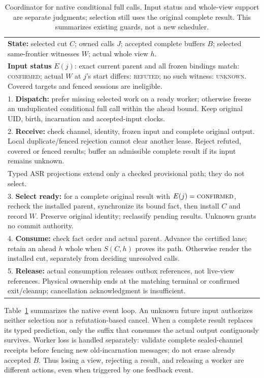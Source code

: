 \begin{table}[t]
\centering
\caption{Coordinator for native conditional full calls. Input status and
whole-view support are separate judgments; selection still uses the
original complete result. This summarizes existing guards, not a new
scheduler.}
\label{tab:coordinator}
\begingroup\small
\begin{tabular}{@{}p{}@{}}
\toprule
\textbf{State:} selected cut $C$; owned calls $J$; accepted complete
buffers $B$; selected same-frontier witnesses $W$; actual whole view $h$.\\
\textbf{Input status} $E(j)$: exact current parent and all frozen bindings
match: \textsc{confirmed}; actual $W$ at $j$'s start differs:
\textsc{refuted}; no such witness: \textsc{unknown}.
Covered targets and fenced sessions are ineligible.\\
\midrule
1. \textbf{Dispatch:} prefer missing selected work on a ready worker;
otherwise freeze an unduplicated conditional full call within the ahead
bound. Keep original UID, birth, incarnation and accepted-input clocks.\\
2. \textbf{Receive:} check channel, identity, frozen input and complete
original output. Local duplicate/fenced rejection cannot clear another
lease. Reject refuted, covered or fenced results; buffer an admissible
complete result if its input remains unknown.\\
Typed ASR projections extend only a checked provisional path; they do not
select.\\
3. \textbf{Select ready:} for a complete original result with
$E(j)=\textsc{confirmed}$, recheck the installed parent, synchronize its
bound fact, then install $C$ and record $W$. Preserve original identity;
reclassify pending results. Unknown grants no commit authority.\\
4. \textbf{Consume:} check fact order and actual parent. Advance the
certified lane; retain an ahead $h$ whole when $S(C,h)$ proves its path.
Otherwise render the installed cut, separately from deciding unresolved calls.\\
5. \textbf{Release:} actual consumption releases outbox references, not
live-view references. Physical ownership ends at the matching terminal
or confirmed exit/cleanup; cancellation acknowledgment is insufficient.\\
\bottomrule
\end{tabular}
\endgroup
\end{table}

Table~\ref{tab:coordinator} summarizes the native event loop. An unknown
future input authorizes neither selection nor a refutation-based cancel.
When a complete result replaces its typed prediction, only the suffix
that consumes the actual output contiguously survives. Worker loss is
handled separately: validate complete sealed-channel receipts before
fencing new old-incarnation messages; do not erase already accepted $B$.
Thus losing a view, rejecting a result, and releasing a worker are
different actions, even when triggered by one feedback event.
